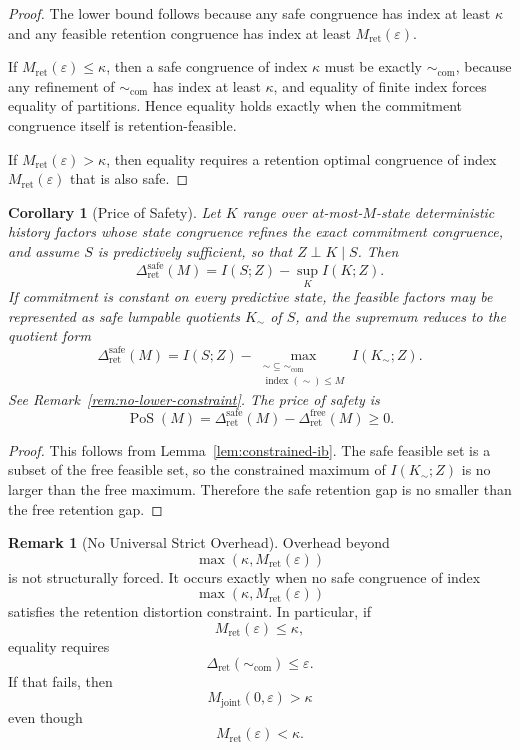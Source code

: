 \documentclass[12pt]{article}
\newtheorem{corollary}[theorem]{Corollary}
\theoremstyle{definition}
\newtheorem{remark}[theorem]{Remark}
\begin{document}
\begin{proof}
The lower bound follows because any safe congruence has index at least $\kappa$
and any feasible retention congruence has index at least
$M_{\mathrm{ret}}(\varepsilon)$.

If $M_{\mathrm{ret}}(\varepsilon)\le\kappa$, then a safe congruence of index
$\kappa$ must be exactly $\sim_{\mathrm{com}}$, because any refinement of
$\sim_{\mathrm{com}}$ has index at least $\kappa$, and equality of finite index
forces equality of partitions.  Hence equality holds exactly when the
commitment congruence itself is retention-feasible.

If $M_{\mathrm{ret}}(\varepsilon)>\kappa$, then equality requires a retention
optimal congruence of index $M_{\mathrm{ret}}(\varepsilon)$ that is also safe.
\end{proof}

\begin{corollary}[Price of Safety]
\label{cor:price-safety}
Let $K$ range over at-most-$M$-state deterministic history factors whose state
congruence refines the exact commitment congruence, and assume $S$ is
predictively sufficient, so that $Z\perp K\mid S$.  Then
\[
\Delta_{\mathrm{ret}}^{\mathrm{safe}}(M)
=
I(S;Z)
-
\sup_{K}
I(K;Z).
\]
If commitment is constant on every predictive state, the feasible factors may
be represented as safe lumpable quotients $K_\sim$ of $S$, and the supremum
reduces to the quotient form
\[
\Delta_{\mathrm{ret}}^{\mathrm{safe}}(M)
=
I(S;Z)
-
\max_{\substack{
\sim\subseteq\sim_{\mathrm{com}}\\
\operatorname{index}(\sim)\le M
}}
I(K_\sim;Z).
\]
See Remark~\ref{rem:no-lower-constraint}.
The price of safety is
\[
\operatorname{PoS}(M)
=
\Delta_{\mathrm{ret}}^{\mathrm{safe}}(M)
-
\Delta_{\mathrm{ret}}^{\mathrm{free}}(M)
\ge0.
\]
\end{corollary}

\begin{proof}
This follows from Lemma~\ref{lem:constrained-ib}.  The safe feasible set is a
subset of the free feasible set, so the constrained maximum of $I(K_\sim;Z)$
is no larger than the free maximum.  Therefore the safe retention gap is no
smaller than the free retention gap.
\end{proof}

\begin{remark}[No Universal Strict Overhead]
\label{rem:no-universal-overhead}
Overhead beyond
\[
\max(\kappa,M_{\mathrm{ret}}(\varepsilon))
\]
is not structurally forced.  It occurs exactly when no safe congruence of index
\[
\max(\kappa,M_{\mathrm{ret}}(\varepsilon))
\]
satisfies the retention distortion constraint.  In particular, if
\[
M_{\mathrm{ret}}(\varepsilon)\le\kappa,
\]
equality requires
\[
\Delta_{\mathrm{ret}}(\sim_{\mathrm{com}})\le\varepsilon.
\]
If that fails, then
\[
M_{\mathrm{joint}}(0,\varepsilon)>\kappa
\]
even though
\[
M_{\mathrm{ret}}(\varepsilon)<\kappa.
\]
\end{remark}
\end{document}
